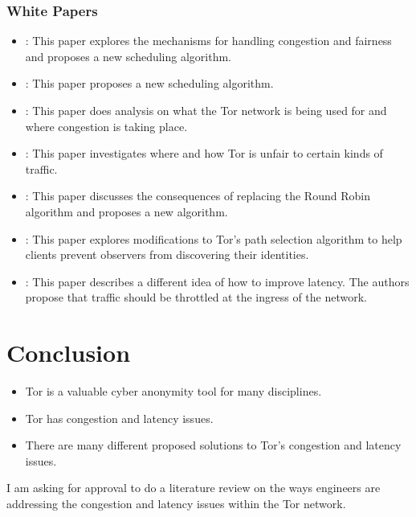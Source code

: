 \documentclass[letterpaper,13pt]{texMemo}
\begin{document}
\subsubsection*{White Papers}
\begin{itemize}
    \item
    \citeauthor*{unfair}: This paper explores the mechanisms for handling congestion
    and fairness and proposes a new scheduling algorithm.
    \item
    \citeauthor*{Tang}: This paper proposes a new scheduling algorithm.
    \item
    \citeauthor*{analysis}: This paper does analysis on what the Tor network is being used for and where congestion is taking place.
    \item
    \citeauthor*{delay}: This paper investigates where and how Tor is unfair to certain kinds of traffic.
    \item
    \citeauthor*{Bauer}: This paper discusses the consequences of replacing the Round Robin algorithm and
    proposes a new algorithm.
    \item
    \citeauthor*{Edman}: This paper explores modifications to Tor's path selection algorithm to help
    clients prevent observers from discovering their identities.
    \item
    \citeauthor*{Moore}: This paper describes a different idea of how to improve latency. The
    authors propose that traffic should be throttled at the ingress of the network.

\end{itemize}


\section*{Conclusion}
\begin{itemize}
    \item
    Tor is a valuable cyber anonymity tool for many disciplines.
    \item
    Tor has congestion and latency issues.
    \item
    There are many different proposed solutions to Tor's congestion and latency issues.
\end{itemize}
I am asking for approval to do a literature review on the ways engineers are addressing the
congestion and latency issues within the Tor network.



\end{document}
